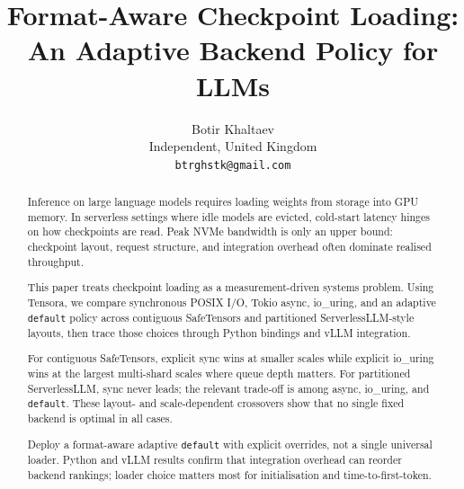 \documentclass[10pt,letterpaper]{article}
\title{Format-Aware Checkpoint Loading: An Adaptive Backend Policy for LLMs}
\author{
  Botir Khaltaev\\
  Independent, United Kingdom\\
  \texttt{btrghstk@gmail.com}
}
\begin{document}
\maketitle

\begin{abstract}
Inference on large language models requires loading weights from storage into GPU memory. In serverless settings where idle models are evicted, cold-start latency hinges on how checkpoints are read. Peak NVMe bandwidth is only an upper bound: checkpoint layout, request structure, and integration overhead often dominate realised throughput.

This paper treats checkpoint loading as a measurement-driven systems problem. Using Tensora, we compare synchronous POSIX I/O, Tokio async, io\_uring, and an adaptive \texttt{default} policy across contiguous SafeTensors and partitioned ServerlessLLM-style layouts, then trace those choices through Python bindings and vLLM integration.

For contiguous SafeTensors, explicit sync wins at smaller scales while explicit io\_uring wins at the largest multi-shard scales where queue depth matters. For partitioned ServerlessLLM, sync never leads; the relevant trade-off is among async, io\_uring, and \texttt{default}. These layout- and scale-dependent crossovers show that no single fixed backend is optimal in all cases.

Deploy a format-aware adaptive \texttt{default} with explicit overrides, not a single universal loader. Python and vLLM results confirm that integration overhead can reorder backend rankings; loader choice matters most for initialisation and time-to-first-token.
\end{abstract}












\appendix




\end{document}
